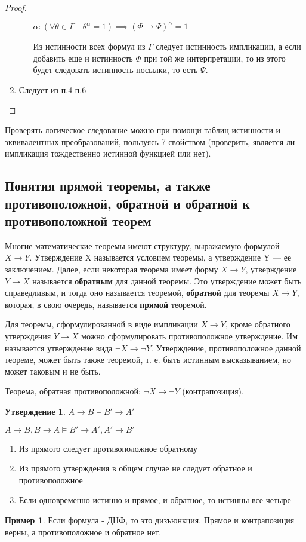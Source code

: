\documentclass[a4paper]{article}
\theoremstyle{definition}
\newtheorem*{example}{Пример}
\newtheorem*{statement}{Утверждение}
\theoremstyle{remark}
\begin{document}
\begin{proof}
\begin{enumerate}
\begin{itemize}
                $\alpha: (\forall \theta \in \Gamma \quad \theta^\alpha = 1)\implies (\Phi\to \Psi)^\alpha = 1$

                Из истинности всех формул из $\Gamma$ следует истинность импликации, а если добавить еще и 
                истинность $\Phi$ при той же интерпретации, то из этого будет следовать истинность посылки, то есть $\Psi$.  
            \end{itemize}
            \item Следует из п.4-п.6
        \end{enumerate}
    \end{proof}
    Проверять логическое следование можно при помощи таблиц истинности и эквивалентных преобразований, пользуясь 7 свойством
    (проверить, является ли импликация тождественно истинной функцией или нет).
    \subsection{Понятия прямой теоремы, а также противоположной, обратной и обратной к противоположной теорем}
    Многие математические теоремы имеют структуру, выражаемую формулой $X\to Y$. 
    Утверждение X называется условием теоремы, а утверждение Y — ее заключением.
    Далее, если некоторая теорема имеет форму $X\to Y$, утверждение $Y\to X$ называется \textbf{обратным} для данной теоремы.
    Это утверждение может быть справедливым, и тогда оно называется теоремой, \textbf{обратной} для теоремы $X\to Y$, которая, 
    в свою очередь, называется \textbf{прямой} теоремой.

    Для теоремы, сформулированной в виде импликации $X\to Y$, кроме обратного утверждения $Y\to X$
    можно сформулировать противоположное утверждение. Им называется утверждение вида $\lnot X\to\lnot Y$.
    Утверждение, противоположное данной теореме, может быть также теоремой, т. е. быть истинным высказыванием,
    но может таковым и не быть. 

    Теорема, обратная противоположной: $\lnot X\to\lnot Y$ (контрапозиция).
    \begin{statement}
        $A\to B \models B' \to A'$

        $A\to B, B\to A \models B' \to A', A' \to B'$

        \begin{enumerate}
            \item Из прямого следует противоположное обратному
            \item Из прямого утверждения в общем случае не следует обратное и противоположное 
            \item Если одновременно истинно и прямое, и обратное, то истинны все четыре
        \end{enumerate}
    \end{statement}
    \begin{example}
        Если формула - ДНФ, то это дизъюнкция.
        Прямое и контрапозиция верны, а противоположное и обратное нет.
    \end{example}
\end{document}
